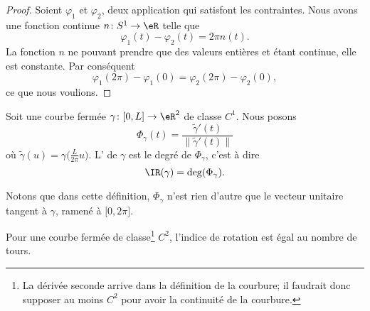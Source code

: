 \begin{proof}
    Soient \( \varphi_1\) et \( \varphi_2\), deux application qui satisfont les contraintes. Nous avons une fonction continue \( n\colon S^1\to \eR\) telle que
    \begin{equation}
        \varphi_1(t)-\varphi_2(t)=2\pi n(t).
    \end{equation}
    La fonction \( n\) ne pouvant prendre que des valeurs entières et étant continue, elle est constante. Par conséquent
    \begin{equation}
        \varphi_1(2\pi)-\varphi_1(0)=\varphi_2(2\pi)-\varphi_2(0),
    \end{equation}
    ce que nous voulions.
\end{proof}

\begin{definition}      \label{DEFooOCUQooUAlbLo}
    Soit une courbe fermée \( \gamma\colon \mathopen[ 0 , L \mathclose]\to \eR^2\) de classe \( C^1\). Nous posons
    \begin{equation}
        \Phi_{\gamma}(t)=\frac{ \tilde \gamma'(t) }{ \| \tilde \gamma'(t) \| }
    \end{equation}
    où \( \tilde \gamma(u)=\gamma\big( \frac{ L }{ 2\pi }u \big)\). L' de \( \gamma\) est le degré de \( \Phi_{\gamma}\), c'est à dire
    \begin{equation}
        \IR(\gamma)=\deg(\Phi_{\gamma}).
    \end{equation}
\end{definition}
Notons que dans cette définition, \( \Phi_{\gamma}\) n'est rien d'autre que le vecteur unitaire tangent à \( \gamma\), ramené à \( \mathopen[ 0 , 2\pi \mathclose]\).

\begin{proposition}     \label{PROPooXHSDooDDnlJQ}
    Pour une courbe fermée de classe\footnote{La dérivée seconde arrive dans la définition de la courbure; il faudrait donc supposer au moins \( C^2\) pour avoir la continuité de la courbure.} \( C^{2}\), l'indice de rotation est égal au nombre de tours.
\end{proposition}

